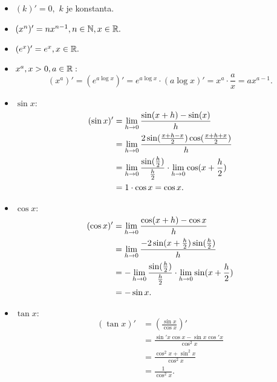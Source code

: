 \begin{remark}
    \label{rm:derivaceelfce}
    \leavevmode
    \begin{itemize}
        \item $(k)' = 0,$ $k$ je konstanta.
        \item $(x^n)' = nx^{n-1}, n \in \mathbb{N}, x \in \mathbb{R}.$
        \item $(e^x)' = e^x, x \in \mathbb{R}.$
        \item $x^a, x> 0, a \in \mathbb{R}:$
            $$(x^a)' = (e^{a\log x})' = e^{a \log x} \cdot (a \log x)' = 
            x^a \cdot \frac{a}{x} = ax^{a-1}.$$
        \item $\sin x:$
            \begin{align*}
                (\sin x)' &= \lim_{h \to 0} \frac{\sin(x+h) - \sin(x)}{h} \\
                          &= \lim_{h \to 0} \frac{2\sin(\frac{x+h-x}{2})\cos(\frac{x+h+x}{2})}{h} \\
                          &= \lim_{h \to 0} \frac{\sin(\frac{h}{2})}{\frac{h}{2}} \cdot \lim_{h \to 0} \cos(x + \frac{h}{2}) \\
                          &= 1 \cdot \cos x = \cos x.
            \end{align*}
        \item $\cos x:$
            \begin{align*}
                (\cos x)' &= \lim_{h \to 0} \frac{\cos(x+h) - \cos x}{h} \\
                          &= \lim_{h \to 0} \frac{-2\sin(x+\frac{h}{2})\sin(\frac{h}{2})}{h} \\
                          &= - \lim_{h \to 0} \frac{\sin(\frac{h}{2})}{\frac{h}{2}} \cdot \lim_{h \to 0} \sin(x + \frac{h}{2}) \\
                          &= -\sin x.
            \end{align*}
        \item $\tan x:$
            \begin{align*}
                (\tan x)' &= \left(\frac{\sin x}{\cos x}\right)' \\
                         &= \frac{\sin' x \cos x - \sin x \cos' x}{\cos^2 x} \\
                         &= \frac{\cos^2 x + \sin^2 x}{\cos^2 x} \\
                         &= \frac{1}{\cos^2 x}.
            \end{align*}


\end{itemize}
\end{remark}
